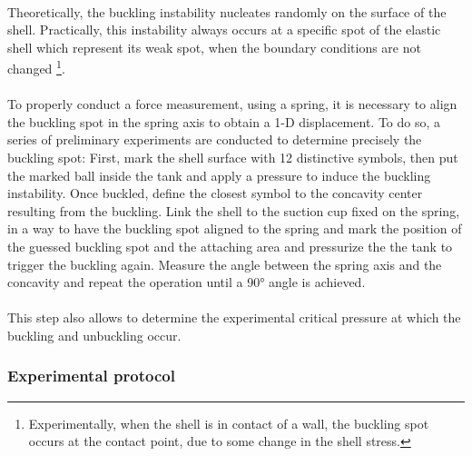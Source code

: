\paragraph{}
Theoretically, the buckling instability nucleates randomly  on the surface of the shell. Practically, this instability always occurs at a specific spot of the elastic shell which represent its weak spot, when the boundary conditions are not changed \footnote{Experimentally, when the shell is in contact of a wall, the buckling spot occurs at the contact point, due to some change in the shell stress.}.
\paragraph{}
To properly conduct a force measurement, using a spring, it is necessary to align the buckling spot in the spring axis to obtain a 1-D displacement. To do so, a series of preliminary experiments are conducted to determine precisely the buckling spot:
First, mark the shell surface with 12 distinctive symbols, then put the marked ball inside the tank and apply a pressure to induce the buckling instability. Once buckled, define the closest symbol to the concavity center resulting from the buckling. Link the shell to the suction cup fixed on the spring, in a way to have the buckling spot aligned to the spring and mark the position of the guessed buckling spot and the attaching area and pressurize the the tank to trigger the buckling again. Measure the angle between the spring axis and the concavity and repeat the operation until a 90° angle is achieved. 
\paragraph{}
This step also allows to determine the experimental critical pressure at which the buckling and unbuckling occur.
\subsubsection{Experimental protocol}
